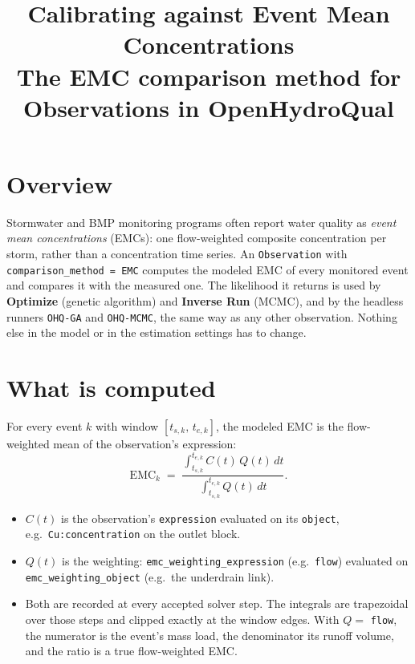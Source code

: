 \documentclass[11pt,a4paper]{article}
\title{\textbf{Calibrating against Event Mean Concentrations}\\[0.3em]
       \large The EMC comparison method for Observations in OpenHydroQual}
\author{}
\date{}
\newcommand{\code}[1]{\texttt{\small #1}}
\begin{document}
\maketitle
\tableofcontents

\section{Overview}

Stormwater and BMP monitoring programs often report water quality as
\emph{event mean concentrations} (EMCs): one flow-weighted composite
concentration per storm, rather than a concentration time series. An
\code{Observation} with \code{comparison\_method = EMC} computes the modeled EMC
of every monitored event and compares it with the measured one. The likelihood it
returns is used by \textbf{Optimize} (genetic algorithm) and \textbf{Inverse Run}
(MCMC), and by the headless runners \code{OHQ-GA} and \code{OHQ-MCMC}, the same
way as any other observation. Nothing else in the model or in the estimation
settings has to change.

\section{What is computed}

For every event $k$ with window $[t_{s,k},\,t_{e,k}]$, the modeled EMC is the
flow-weighted mean of the observation's expression:
\begin{equation}
  \mathrm{EMC}_k \;=\; \frac{\displaystyle\int_{t_{s,k}}^{t_{e,k}} C(t)\,Q(t)\,dt}
                           {\displaystyle\int_{t_{s,k}}^{t_{e,k}} Q(t)\,dt}.
\end{equation}
\begin{itemize}[leftmargin=1.4em]
  \item $C(t)$ is the observation's \code{expression} evaluated on its
        \code{object}, e.g.\ \code{Cu:concentration} on the outlet block.
  \item $Q(t)$ is the weighting: \code{emc\_weighting\_expression}
        (e.g.\ \code{flow}) evaluated on \code{emc\_weighting\_object}
        (e.g.\ the underdrain link).
  \item Both are recorded at every accepted solver step. The integrals are
        trapezoidal over those steps and clipped exactly at the window edges.
        With $Q=$ \code{flow}, the numerator is the event's mass load, the
        denominator its runoff volume, and the ratio is a true flow-weighted EMC.
\end{itemize}
\end{document}
